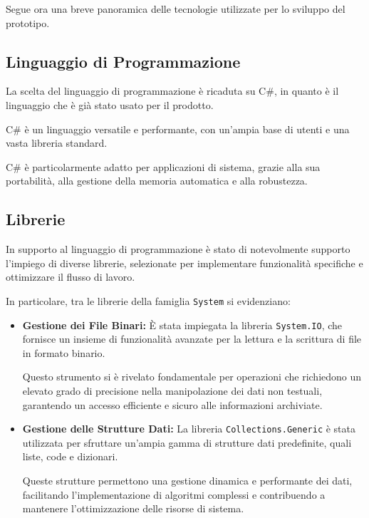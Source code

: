 \documentclass[12pt,a4paper,openright,twoside]{book}
\begin{document}
        Segue ora una breve panoramica delle tecnologie utilizzate per lo sviluppo del prototipo.

        \subsection{Linguaggio di Programmazione}

            La scelta del linguaggio di programmazione è ricaduta su C\#, in quanto è il linguaggio che è già stato usato per il prodotto.

            C\# è un linguaggio versatile e performante, con un'ampia base di utenti e una vasta libreria standard.

            C\# è particolarmente adatto per applicazioni di sistema, grazie alla sua portabilità, alla gestione della memoria automatica e alla robustezza.

        \subsection{Librerie}

            In supporto al linguaggio di programmazione è stato di notevolmente supporto l’impiego di diverse librerie, selezionate per implementare funzionalità specifiche e ottimizzare il flusso di lavoro.

            In particolare, tra le librerie della famiglia \texttt{System} si evidenziano:

            \begin{itemize}
                \item \textbf{Gestione dei File Binari:} È stata impiegata la libreria \texttt{System.IO}, che fornisce un insieme di funzionalità avanzate per la lettura e la scrittura di file in formato binario.

                Questo strumento si è rivelato fondamentale per operazioni che richiedono un elevato grado di precisione nella manipolazione dei dati non testuali, garantendo un accesso efficiente e sicuro alle informazioni archiviate.

                \item \textbf{Gestione delle Strutture Dati:} La libreria \texttt{Collections.Generic} è stata utilizzata per sfruttare un’ampia gamma di strutture dati predefinite, quali liste, code e dizionari.

                Queste strutture permettono una gestione dinamica e performante dei dati, facilitando l’implementazione di algoritmi complessi e contribuendo a mantenere l’ottimizzazione delle risorse di sistema.
            \end{itemize}
\end{document}
